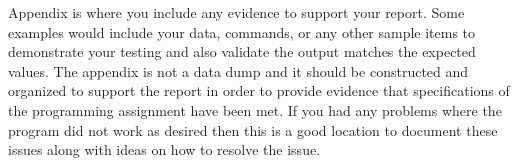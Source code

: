 \documentclass{article}
\begin{document}
{\color{black}  Appendix is where you include any evidence to support your report. Some examples would include your data, commands, or any other sample items to demonstrate your testing and also validate the output matches the expected values. The appendix is not a data dump and it should be constructed and organized to support the report in order to provide evidence that specifications of the programming assignment have been met.  If you had any problems where the program did not work as desired then this is a good location to document these issues along with ideas on how to resolve the issue.  } 

\par \medskip



\end{document}
